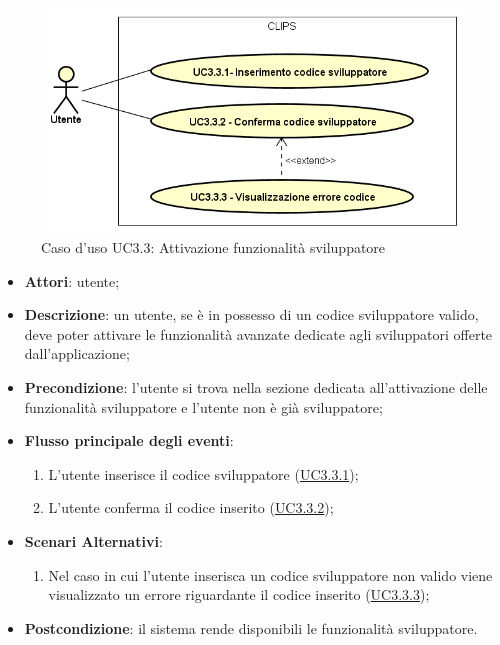 \documentclass[../AnalisiDeiRequisiti.tex]{subfiles}
\begin{document}
        \begin{figure}[!h]
            \centering
            \includegraphics[scale=0.95, width=\textwidth]{img/UC3-3.png}
            \caption{Caso d'uso UC3.3: Attivazione funzionalità sviluppatore}\label{fig:UC3.3} 
        \end{figure}
\begin{itemize}
\item \textbf{Attori}: utente;
\item \textbf{Descrizione}: un utente, se è in possesso di un codice sviluppatore valido, deve poter attivare le funzionalità avanzate dedicate agli sviluppatori offerte dall'applicazione; 
      \item \textbf{Precondizione}: l'utente si trova nella sezione dedicata all'attivazione delle funzionalità sviluppatore e l'utente non è già sviluppatore;

        \item \textbf{Flusso principale degli eventi}:
          \begin{enumerate}
          \item L'utente inserisce il codice sviluppatore (\hyperlink{UC3.3.1}{UC3.3.1});
          \item L'utente conferma il codice inserito (\hyperlink{UC3.3.2}{UC3.3.2});

      \end{enumerate}
    \item \textbf{Scenari Alternativi}:
      \begin{enumerate}
          \item Nel caso in cui l'utente inserisca un codice sviluppatore non valido viene visualizzato un errore riguardante il codice inserito (\hyperlink{UC3.3.3}{UC3.3.3});

      \end{enumerate}
    \item \textbf{Postcondizione}: il sistema rende disponibili le funzionalità sviluppatore.
  \end{itemize}
\hypertarget{UC3.3.1}{}
\end{document}
